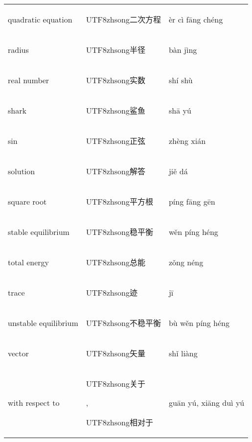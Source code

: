 \documentclass{amsart}
\newcommand\han[1]{\begin{CJK*}{UTF8}{zhsong}#1\end{CJK*}}
\begin{document}
\begin{longtable}{lll}
quadratic equation	& \han{二次方程}	& èr cì fāng chéng         \\
radius			& \han{半径}	& bàn jìng                 \\
real number		& \han{实数}	& shí shù                  \\
shark			& \han{鲨鱼}	& shā yú                   \\
sin			& \han{正弦}	& zhèng xián               \\
solution		& \han{解答}	& jiě dá                   \\
square root		& \han{平方根}	& píng fāng gēn            \\
stable equilibrium	& \han{稳平衡}	& wěn píng héng            \\
total energy		& \han{总能}	& zǒng néng                \\
trace                   & \han{迹}      & jī                       \\
unstable equilibrium	& \han{不稳平衡}	& bù wěn píng héng         \\
vector			& \han{矢量}	& shǐ liàng                \\
with respect to         & \han{关于}, \han{相对于} & guān yú, xiāng duì yú                         \\
\end{longtable}
\end{document}
